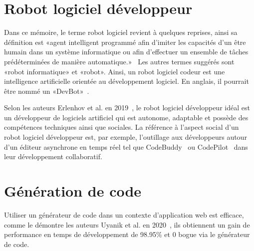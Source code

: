 \label{sec:RevLitt}

\section{Robot logiciel développeur}\label{robot_logiciel_developpeur_revue}

Dans ce mémoire, le terme robot logiciel revient à quelques reprises, ainsi sa définition est «agent intelligent programmé afin d'imiter les capacités d'un être humain dans un système informatique ou afin d'effectuer un ensemble de tâches prédéterminées de manière automatique.»~\cite{robot_logiciel_oqlf_2018} Les autres termes suggérés sont «robot informatique» et «robot». Ainsi, un robot logiciel codeur est une intelligence artificielle orientée au développement logiciel. En anglais, il pourrait être nommé un «DevBot»~\cite{8823643}.

Selon les auteurs Erlenhov et al. en 2019~\cite{8823643}, le robot logiciel développeur idéal est un développeur de logiciels artificiel qui est autonome, adaptable et possède des compétences techniques ainsi que sociales. La référence à l'aspect social d'un robot logiciel développeur est, par exemple, l'outillage aux développeurs autour d'un éditeur asynchrone en temps réel tel que CodeBuddy~\cite{10.1145/3287324.3293750} ou CodePilot~\cite{10.5555/1030453.1030540} dans leur développement collaboratif.

\section{Génération de code}

Utiliser un générateur de code dans un contexte d'application web est efficace, comme le démontre les auteurs Uyanik et al. en 2020~\cite{SAHIN2020}, ils obtiennent un gain de performance en temps de développement de 98.95\% et 0 bogue via le générateur de code.

